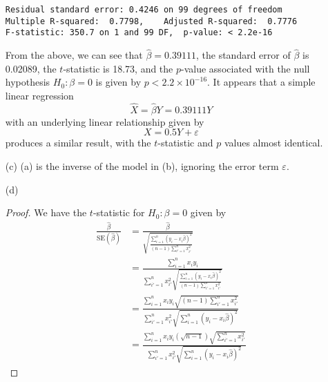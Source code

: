 \begin{itemize}
\begin{verbatim}
Residual standard error: 0.4246 on 99 degrees of freedom
Multiple R-squared:  0.7798,    Adjusted R-squared:  0.7776 
F-statistic: 350.7 on 1 and 99 DF,  p-value: < 2.2e-16
        \end{verbatim}\normalsize
        From the above, we can see that $\hat{\beta} = 0.39111$, the standard error
        of $\hat{\beta}$ is 0.02089, the $t$-statistic is 18.73, and the $p$-value
        associated with the null hypothesis $H_0 : \beta = 0$ is given by 
        $p < 2.2 \times 10^{-16}$. It appears that a simple linear regression 
        \[
            \hat{X} = \hat{\beta} Y = 0.39111Y
        \]
        with an underlying linear relationship given by 
        \[
            X = 0.5Y + \varepsilon
        \]
        produces a similar result, with the $t$-statistic and $p$ values almost 
        identical.
    \item[(c)] (a) is the inverse of the model in (b), ignoring the error term
        $\varepsilon$.
    \item[(d)]
        \begin{proof}
            We have the $t$-statistic for $H_0 : \beta = 0$ given by
            \begin{equation*}
                \begin{split}
                    \frac{\hat{\beta}}{\text{SE}(\hat{\beta})}
                    &= \frac{\hat{\beta}}{\sqrt{
                        \frac{\sum_{i=1}^n {(y_i - x_i\hat{\beta})}^2}
                        {(n - 1)\sum_{i'=1}^n x_{i'}^2}
                    }} \\
                    &= \frac{\sum_{i=1}^n x_i y_i}{
                        \sum_{i'=1}^n x_{i'}^2
                        \sqrt{\frac{\sum_{i=1}^n {(y_i - x_i\hat{\beta})}^2}
                            {(n - 1)\sum_{i'=1}^n x_{i'}^2}
                        }} \\
                    &= \frac{
                            \sum_{i=1}^n x_i y_i
                            \sqrt{(n - 1)\sum_{i'=1}^n x_{i'}^2}
                        }{
                            \sum_{i'=1}^n x_{i'}^2
                            \sqrt{\sum_{i=1}^n {(y_i - x_i\hat{\beta})}^2}
                        } \\
                    &= \frac{
                            \sum_{i=1}^n x_i y_i
                            (\sqrt{n - 1})\sqrt{\sum_{i'=1}^n x_{i'}^2}
                        }{
                            \sum_{i'=1}^n x_{i'}^2
                            \sqrt{\sum_{i=1}^n {(y_i - x_i\hat{\beta})}^2}
}
\end{split}
\end{equation*}
\end{proof}
\end{itemize}
